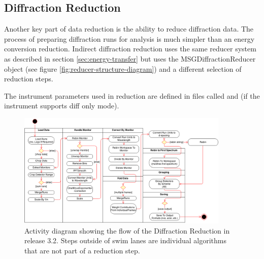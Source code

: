 \documentclass[paper=a4, fontsize=11pt]{scrartcl}	%
\numberwithin{equation}{section}															%
\numberwithin{figure}{section}																%
\numberwithin{table}{section}																%
\begin{document}
\subsection{Diffraction Reduction}
\label{subsec:indirect-diffraction}
Another key part of data reduction is the ability to reduce diffraction data. The process of preparing diffraction runs for analysis is much simpler than an energy conversion reduction. Indirect diffraction reduction uses the same reducer system as described in section \ref{sec:energy-transfer} but uses the MSGDiffractionReducer object (see figure \ref{fig:reducer-structure-diagram}) and a different selection of reduction steps. 

The instrument parameters used in reduction are defined in files called  and  (if the instrument supports diff only mode).

\begin{figure}[H]
\centering
\includegraphics[width=0.9\textwidth]{img/uml/activity_diagrams/DiffractionReduction_activity.png}
\caption{Activity diagram showing the flow of the Diffraction Reduction in release 3.2. Steps outside of swim lanes are individual algorithms that are not part of a reduction step.}
\label{fig:diffraction-class-diagram}
\end{figure}
\end{document}
